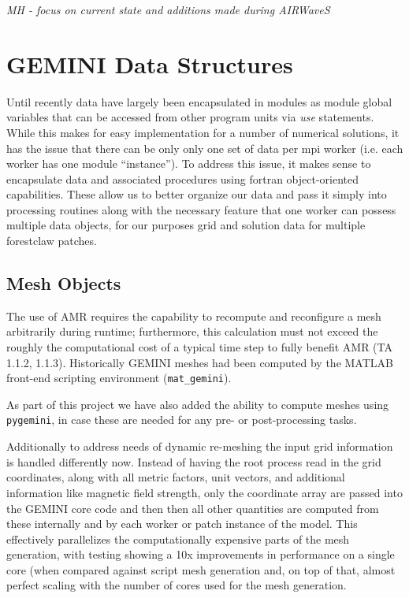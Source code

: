 \documentclass[11pt,letterpaper]{article}
\begin{document}
\emph{MH - focus on current state and additions made during AIRWaveS}



\section{GEMINI Data Structures}

Until recently data have largely been encapsulated in modules as module global variables that can be accessed from other program units via \emph{use} statements.  While this makes for easy implementation for a number of numerical solutions, it has the issue that there can be only only one set of data per mpi worker (i.e. each worker has one module ``instance'').  To address this issue, it makes sense to encapsulate data and associated procedures using fortran object-oriented capabilities.  These allow us to better organize our data and pass it simply into processing routines along with the necessary feature that one worker can possess multiple data objects, for our purposes  grid and solution data for multiple forestclaw patches.  


\subsection{Mesh Objects}

The use of AMR requires the capability to recompute and reconfigure a mesh arbitrarily during runtime; furthermore, this calculation must not exceed the roughly the computational cost of a typical time step to fully benefit AMR (TA 1.1.2, 1.1.3).  Historically GEMINI meshes had been computed by the MATLAB front-end scripting environment (\texttt{mat\_gemini}).

As part of this project we have also added the ability to compute meshes using \texttt{pygemini}, in case these are needed for any pre- or post-processing tasks.  

Additionally to address needs of dynamic re-meshing the input grid information is handled differently now.  Instead of having the root process read in the grid coordinates, along with all metric factors, unit vectors, and additional information like magnetic field strength, only the coordinate array are passed into the GEMINI core code and then then all other quantities are computed from these internally and by each worker or patch instance of the model.  This effectively parallelizes the computationally expensive parts of the mesh generation, with testing showing a 10x improvements in performance on a single core (when compared against script mesh generation and, on top of that, almost perfect scaling with the number of cores used for the mesh generation.
\end{document}
